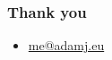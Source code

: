 \documentclass{beamer}
\begin{document}
\begin{frame}\frametitle{Thank you}

    \begin{itemize}
        \item \url{me@adamj.eu}
    \end{itemize}

\end{frame}
\end{document}
